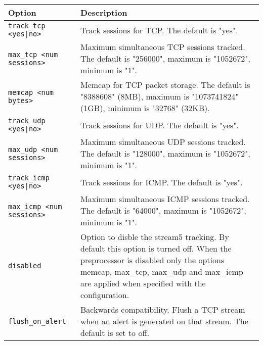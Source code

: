 \documentclass[english]{report}
\begin{document}
\begin{center}
\begin{tabular}{| l | p{4.5in} |}

\hline
\textbf{Option} & \textbf{Description}\\
\hline 

\hline 
\texttt{track\_tcp <yes|no>} &

Track sessions for TCP.  The default is "yes".\\

\hline
\texttt{max\_tcp <num sessions>} &

Maximum simultaneous TCP sessions tracked.  The default is "256000", maximum is
"1052672", minimum is "1".\\

\hline
\texttt{memcap <num bytes>} &

Memcap for TCP packet storage.  The default is "8388608" (8MB), maximum is
"1073741824" (1GB), minimum is "32768" (32KB).\\

\hline
\texttt{track\_udp <yes|no>} &

Track sessions for UDP.  The default is "yes".\\

\hline
\texttt{max\_udp <num sessions>} &

Maximum simultaneous UDP sessions tracked.  The default is "128000", maximum is
"1052672", minimum is "1".\\

\hline
\texttt{track\_icmp <yes|no>} &

Track sessions for ICMP.  The default is "yes".\\

\hline
\texttt{max\_icmp <num sessions>} &

Maximum simultaneous ICMP sessions tracked.  The default is "64000", maximum is
"1052672", minimum is "1".\\

\hline 
\texttt{disabled} &

Option to disble the stream5 tracking. By default this option is turned off.
When the preprocessor is disabled only the options memcap, max\_tcp, max\_udp 
and max\_icmp are applied when specified with the configuration.\\

\hline
\texttt{flush\_on\_alert} &

Backwards compatibility.  Flush a TCP stream when an alert is generated on that
stream.  The default is set to off.\\


\end{tabular}
\end{center}
\end{document}
